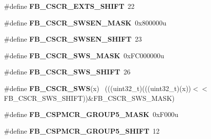 \begin{DoxyCompactItemize}
\item 
\hypertarget{group___f_b___register___masks_ga095a10ba51cbcdf10aca9bf9d5692613}{}\#define {\bfseries F\+B\+\_\+\+C\+S\+C\+R\+\_\+\+E\+X\+T\+S\+\_\+\+S\+H\+I\+F\+T}~22\label{group___f_b___register___masks_ga095a10ba51cbcdf10aca9bf9d5692613}

\item 
\hypertarget{group___f_b___register___masks_ga38d5806081b68b58dff2b73abcab4d1a}{}\#define {\bfseries F\+B\+\_\+\+C\+S\+C\+R\+\_\+\+S\+W\+S\+E\+N\+\_\+\+M\+A\+S\+K}~0x800000u\label{group___f_b___register___masks_ga38d5806081b68b58dff2b73abcab4d1a}

\item 
\hypertarget{group___f_b___register___masks_gad89987be24118d73c55bf5e97ab5e8d7}{}\#define {\bfseries F\+B\+\_\+\+C\+S\+C\+R\+\_\+\+S\+W\+S\+E\+N\+\_\+\+S\+H\+I\+F\+T}~23\label{group___f_b___register___masks_gad89987be24118d73c55bf5e97ab5e8d7}

\item 
\hypertarget{group___f_b___register___masks_ga1036d22baaa692a66480d3ef93bc9729}{}\#define {\bfseries F\+B\+\_\+\+C\+S\+C\+R\+\_\+\+S\+W\+S\+\_\+\+M\+A\+S\+K}~0x\+F\+C000000u\label{group___f_b___register___masks_ga1036d22baaa692a66480d3ef93bc9729}

\item 
\hypertarget{group___f_b___register___masks_ga1ba720e1700a6ddc15457b55d8fbb376}{}\#define {\bfseries F\+B\+\_\+\+C\+S\+C\+R\+\_\+\+S\+W\+S\+\_\+\+S\+H\+I\+F\+T}~26\label{group___f_b___register___masks_ga1ba720e1700a6ddc15457b55d8fbb376}

\item 
\hypertarget{group___f_b___register___masks_ga88bb14898062706f58a15f988c6aad47}{}\#define {\bfseries F\+B\+\_\+\+C\+S\+C\+R\+\_\+\+S\+W\+S}(x)                                                  ~(((uint32\+\_\+t)(((uint32\+\_\+t)(x))$<$$<$F\+B\+\_\+\+C\+S\+C\+R\+\_\+\+S\+W\+S\+\_\+\+S\+H\+I\+F\+T))\&F\+B\+\_\+\+C\+S\+C\+R\+\_\+\+S\+W\+S\+\_\+\+M\+A\+S\+K)\label{group___f_b___register___masks_ga88bb14898062706f58a15f988c6aad47}

\item 
\hypertarget{group___f_b___register___masks_ga2c198cc055fa5fd82f9f9441613af96d}{}\#define {\bfseries F\+B\+\_\+\+C\+S\+P\+M\+C\+R\+\_\+\+G\+R\+O\+U\+P5\+\_\+\+M\+A\+S\+K}~0x\+F000u\label{group___f_b___register___masks_ga2c198cc055fa5fd82f9f9441613af96d}

\item 
\hypertarget{group___f_b___register___masks_gaa406022bcdd78d1d96d379efcf539ca7}{}\#define {\bfseries F\+B\+\_\+\+C\+S\+P\+M\+C\+R\+\_\+\+G\+R\+O\+U\+P5\+\_\+\+S\+H\+I\+F\+T}~12\label{group___f_b___register___masks_gaa406022bcdd78d1d96d379efcf539ca7}


\end{DoxyCompactItemize}
